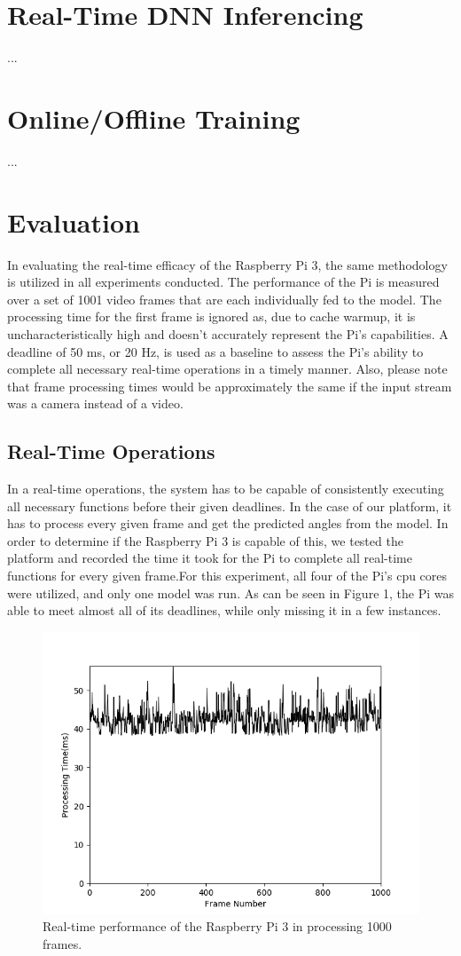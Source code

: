 \documentclass[10pt, conference]{IEEEtran}
\begin{document}
\section{Real-Time DNN Inferencing}
...
\section{Online/Offline Training}
...
\section{Evaluation}
In evaluating the real-time efficacy of the Raspberry Pi 3, the same methodology is utilized in all 
experiments conducted. The performance of the Pi is measured over a set of 1001 video frames that are 
each individually fed to the model. The processing time for the first frame is ignored as, due to 
cache warmup, it is uncharacteristically high and doesn't accurately represent the Pi's capabilities. A 
deadline of 50 ms, or 20 Hz, is used as a baseline to assess the Pi's ability to complete all 
necessary real-time operations in a timely manner. Also, please note that frame processing times 
would be approximately the same if the input stream was a 
camera instead of a video. 

\subsection{Real-Time Operations}
In a real-time operations, the system has to be capable of consistently executing all necessary 
functions before their given deadlines. In the case of our platform, it has to process every given frame 
and get the predicted angles from the model. In order to determine if the Raspberry Pi 3 is capable of 
this, we tested the platform and recorded the time it took for the Pi to complete all real-time 
functions for every given frame.For this experiment, all four of the Pi's cpu cores were utilized, and 
only one model was run. As can be seen in Figure 1, the Pi was able to meet almost all of its deadlines, 
while only missing it in a few instances.

\begin{figure}[h]
  \centering
  \includegraphics[width=.5\textwidth]{Total_Processing_Time}
  \caption{ Real-time performance of the Raspberry Pi 3 in processing 1000 frames.}
\end{figure}
\end{document}
